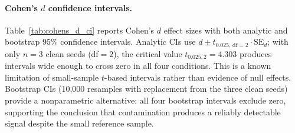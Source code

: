 \begin{table}[t]
\centering
\caption{Seed sensitivity analysis for clean baseline across three independent runs (seeds 42, 123, 456). CV = coefficient of variation ($\mathrm{std}/|\mathrm{mean}|$). These $n{=}3$ pilot results are superseded by the $n{=}10$ analysis in \S\ref{sec:detection}; retained for methodological transparency.}
\label{tab:seed_sensitivity}
\footnotesize
{}
\end{table}

\paragraph{Cohen's $d$ confidence intervals.}
Table~\ref{tab:cohens_d_ci} reports Cohen's $d$ effect sizes with both analytic and bootstrap 95\% confidence intervals.
Analytic CIs use $d \pm t_{0.025,\,\text{df}=2} \cdot \text{SE}_d$; with only $n{=}3$ clean seeds (df${=}2$), the critical value $t_{0.025,2} = 4.303$ produces intervals wide enough to cross zero in all four conditions.
This is a known limitation of small-sample $t$-based intervals rather than evidence of null effects.
Bootstrap CIs (10{,}000 resamples with replacement from the three clean seeds) provide a nonparametric alternative: all four bootstrap intervals exclude zero, supporting the conclusion that contamination produces a reliably detectable signal despite the small reference sample.

